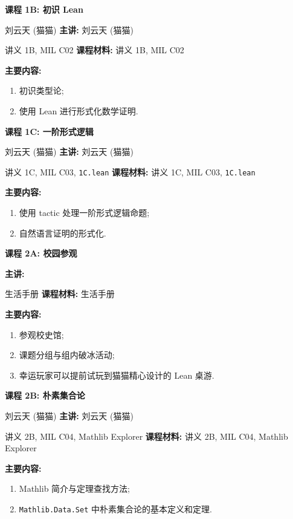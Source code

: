 \documentclass[UTF8]{ctexart}
\DeclareMathOperator{\0}{\mathbf{0}}                    %
\newcommand{\<}{\langle}
\renewcommand{\>}{\rangle}                              %
\newenvironment{thm_box}{
    \begin{tcolorbox}[enhanced, colback=thm_blue2, boxrule=0pt, frame hidden,
        borderline west={0.7mm}{0.1mm}{thm_blue1},breakable]
    }
    {\end{tcolorbox}}
\theoremstyle{MyStyle} %
\newenvironment{crs}[4]
{
    \begin{thm_box}
        \textbf{课程 #1: #2}
        
        \ifx\relax#3\relax\else %
            \textbf{主讲: }#3 %
        \fi
        
        \ifx\relax#4\relax\else %
            \textbf{课程材料: }#4 %
        \fi

        \textbf{主要内容: }
}
{
    \end{thm_box}
}
\begin{document}
            \begin{crs}
                {1B}
                {初识 Lean}
                {刘云天 (猫猫)}
                {讲义 1B, MIL C02}
                \begin{enumerate}
                    \item 初识类型论; 
                    \item 使用 Lean 进行形式化数学证明. 
                \end{enumerate}
            \end{crs}

            \begin{crs}
                {1C}
                {一阶形式逻辑}
                {刘云天 (猫猫)}
                {讲义 1C, MIL C03, \texttt{1C.lean}}
                \begin{enumerate}
                    \item 使用 tactic 处理一阶形式逻辑命题; 
                    \item 自然语言证明的形式化. 
                \end{enumerate}
            \end{crs}

            \begin{crs}
                {2A}
                {校园参观}
                {}
                {生活手册}
                \begin{enumerate}
                    \item 参观校史馆; 
                    \item 课题分组与组内破冰活动; 
                    \item 幸运玩家可以提前试玩到猫猫精心设计的 Lean 桌游. 
                \end{enumerate}
            \end{crs}

            \begin{crs}
                {2B}
                {朴素集合论}
                {刘云天 (猫猫)}
                {讲义 2B, MIL C04, Mathlib Explorer}
                \begin{enumerate}
                    \item Mathlib 简介与定理查找方法; 
                    \item \texttt{Mathlib.Data.Set} 中朴素集合论的基本定义和定理. 
                \end{enumerate}
            \end{crs}
\end{document}
